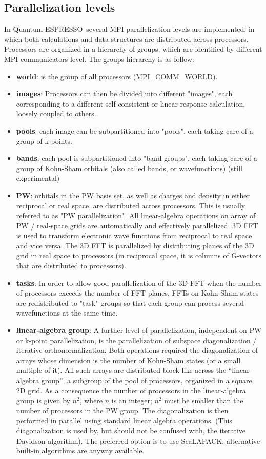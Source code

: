 \documentclass[12pt,a4paper]{article}
\def\qe{{\sc Quantum ESPRESSO}}
\begin{document}
\subsection{Parallelization levels}

In \qe\ several MPI parallelization levels are 
implemented, in which both calculations
and data structures are distributed across processors.
Processors are organized in a hierarchy of groups, 
which are identified by different MPI communicators level.
The groups hierarchy is as follow:
\begin{itemize}
\item {\bf world}: is the group of all processors (MPI\_COMM\_WORLD).
\item 
{\bf images}: Processors can then be divided into different "images", each corresponding to a
different self-consistent or linear-response
calculation, loosely coupled to others.
\item
{\bf pools}: each image can be subpartitioned into
"pools", each taking care of a group of k-points.
\item
{\bf bands}: each pool is subpartitioned into
"band groups", each taking care of a group
of Kohn-Sham orbitals (also called bands, or
wavefunctions) (still experimental)
\item
{\bf PW}: orbitals in the PW basis set,
as well as charges and density in either 
reciprocal or real space, are distributed
across processors.
This is usually referred to as "PW parallelization".
All linear-algebra operations on array of  PW / 
real-space grids are automatically and effectively parallelized.
3D FFT is used to transform electronic wave functions from
reciprocal to real space and vice versa. The 3D FFT is
parallelized by distributing planes of the 3D grid in real
space to processors (in reciprocal space, it is columns of
G-vectors that are distributed to processors). 
\item
{\bf tasks}: 
In order to allow good parallelization of the 3D FFT when 
the number of processors exceeds the number of FFT planes,
FFTs on Kohn-Sham states are redistributed to 
"task" groups so that each group 
can process several wavefunctions at the same time.
\item
{\bf linear-algebra group}:
A further level of parallelization, independent on
PW or k-point parallelization, is the parallelization of
subspace diagonalization / iterative orthonormalization.
 Both operations required the diagonalization of 
arrays whose dimension is the number of Kohn-Sham states
(or a small multiple of it). All such arrays are distributed block-like
across the ``linear-algebra group'', a subgroup of the pool of processors,
organized in a square 2D grid. As a consequence the number of processors
in the linear-algebra group is given by $n^2$, where $n$ is an integer;
$n^2$ must be smaller than the number of processors in the PW group.
The diagonalization is then performed
in parallel using standard linear algebra operations.
(This diagonalization is used by, but should not be confused with,
the iterative Davidson algorithm). The preferred option is to use
ScaLAPACK; alternative built-in algorithms are anyway available.
\end{itemize}
\end{document}

